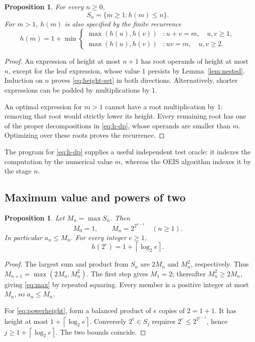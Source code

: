 \documentclass[11pt,a4paper]{article}
\newtheorem{proposition}[theorem]{Proposition}
\theoremstyle{definition}
\theoremstyle{remark}
\renewcommand{\lg}{\log_2}
\newcommand{\ceil}[1]{\left\lceil #1\right\rceil}
\begin{document}
\begin{proposition}\label{prop:height}
For every $n\ge0$,
\begin{equation}\label{eq:height-set}
 S_n=\{m\ge1:h(m)\le n\}.
\end{equation}
For $m>1$, $h(m)$ is also specified by the finite recurrence
\begin{equation}\label{eq:h-dp}
 h(m)=1+\min\left\{
 \begin{array}{ll}
 \max(h(u),h(v)) &: u+v=m,\quad u,v\ge1,\\
 \max(h(u),h(v)) &: uv=m,\quad u,v\ge2.
 \end{array}\right.
\end{equation}
\end{proposition}
\begin{proof}
An expression of height at most $n+1$ has root operands of height at most
$n$, except for the leaf expression, whose value $1$ persists by
Lemma~\ref{lem:nested}. Induction on $n$ proves \eqref{eq:height-set} in
both directions. Alternatively, shorter expressions can be padded by
multiplications by $1$.

An optimal expression for $m>1$ cannot have a root multiplication by $1$:
removing that root would strictly lower its height. Every remaining root
has one of the proper decompositions in \eqref{eq:h-dp}, whose operands
are smaller than $m$. Optimizing over these roots proves the recurrence.
\end{proof}

The program for \eqref{eq:h-dp} supplies a useful independent test oracle:
it indexes the computation by the numerical value $m$, whereas the OEIS
algorithm indexes it by the stage $n$.

\subsection{Maximum value and powers of two}
\begin{proposition}\label{prop:maximum}
Let $M_n=\max S_n$. Then
\begin{equation}\label{eq:max}
 M_0=1,\qquad M_n=2^{2^{n-1}}\quad(n\ge1).
\end{equation}
In particular $a_n\le M_n$. For every integer $e\ge1$,
\begin{equation}\label{eq:powerheight}
 h(2^e)=1+\ceil{\lg e}.
\end{equation}
\end{proposition}
\begin{proof}
The largest sum and product from $S_n$ are $2M_n$ and $M_n^2$, respectively.
Thus $M_{n+1}=\max(2M_n,M_n^2)$. The first step gives $M_1=2$;
thereafter $M_n^2\ge2M_n$, giving \eqref{eq:max} by repeated squaring.
Every member is a positive integer at most $M_n$, so $a_n\le M_n$.

For \eqref{eq:powerheight}, form a balanced product of $e$ copies of
$2=1+1$. It has height at most $1+\ceil{\lg e}$.
Conversely $2^e\in S_j$ requires $2^e\le2^{2^{j-1}}$, hence
$j\ge1+\ceil{\lg e}$. The two bounds coincide.
\end{proof}
\end{document}
